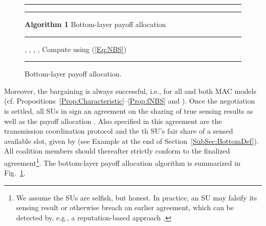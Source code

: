 \documentclass[journal,draftclsnofoot,onecolumn]{IEEEtran}
\theoremstyle{definition}
\def\Extra{0.5ex}
\def\Extra{0.5ex}
\begin{document}
\renewcommand{\algorithmicrequire}{\textbf{Input:}}
\renewcommand{\algorithmicensure}{\textbf{Output:}}
\begin{figure}[!t]

\hrule\hrule\vspace{\Extra}
\textbf{Algorithm 1} Bottom-layer payoff allocation
\vspace{\Extra}
\hrule
\begin{algorithmic}[1]
\Require , , , , 
\Ensure 
\State \label{Line:AdaptTh}
\State 
\State  
\State Compute  using  (\ref{Eq:NBS})
\EndIf
{}
\EndIf
\end{algorithmic}
\hrule
\caption{Bottom-layer payoff allocation.}
\label{Fig:AlgBottom}
\end{figure}

Moreover, the bargaining is always successful, i.e.,  for all  and both MAC models (cf. Propositions~\ref{Prop:Characteristic}--\ref{Prop:fNBS} and \cite{NBSNeg}). Once the negotiation is settled, all SUs in  sign an agreement on the sharing of true sensing results as well as the payoff allocation . Also specified in this agreement are the transmission coordination protocol and the th SU's fair share of a sensed available slot, given by  (see Example at the end of Section~\ref{SubSec:BottomDef}). All coalition members should thereafter strictly conform to the finalized agreement\footnote{We assume the SUs are selfish, but honest. In practice, an SU may falsify its sensing result or otherwise breach an earlier agreement, which can be detected  by, e.g., a reputation-based approach \cite{Reputation}.}.  The bottom-layer payoff allocation algorithm is summarized in Fig.~\ref{Fig:AlgBottom}.
\end{document}
